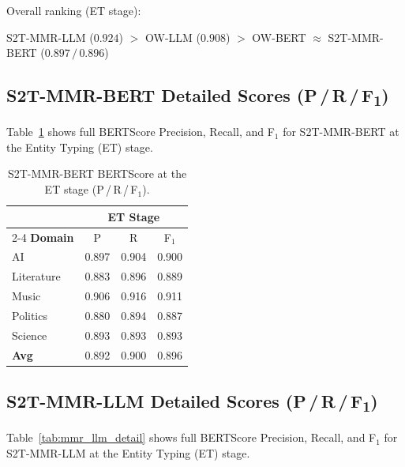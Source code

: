\documentclass[11pt,a4paper]{article}
\begin{document}
\noindent
Overall ranking (ET stage):
\begin{center}
S2T-MMR-LLM ($\mathbf{0.924}$)
$>$ OW-LLM ($0.908$)
$>$ OW-BERT $\approx$ S2T-MMR-BERT ($0.897\,/\,0.896$)
\end{center}

\subsection{S2T-MMR-BERT Detailed Scores (P\,/\,R\,/\,F\textsubscript{1})}

Table~\ref{tab:mmr_detail} shows full BERTScore Precision, Recall, and
F$_1$ for S2T-MMR-BERT at the Entity Typing (ET) stage.

\begin{table}[h]
\centering
\caption{S2T-MMR-BERT BERTScore at the ET stage (P\,/\,R\,/\,F$_1$).}
\label{tab:mmr_detail}
\setlength{\tabcolsep}{6pt}
\small
\begin{tabular}{l ccc}
\toprule
& \multicolumn{3}{c}{\cellcolor{s2tmmrcol}\textbf{ET Stage}} \\
\cmidrule(lr){2-4}
\textbf{Domain} & P & R & F$_1$ \\
\midrule
AI         & 0.897 & 0.904 & 0.900 \\
Literature & 0.883 & 0.896 & 0.889 \\
Music      & 0.906 & 0.916 & 0.911 \\
Politics   & 0.880 & 0.894 & 0.887 \\
Science    & 0.893 & 0.893 & 0.893 \\
\midrule
\textbf{Avg} & 0.892 & 0.900 & 0.896 \\
\bottomrule
\end{tabular}
\end{table}

\subsection{S2T-MMR-LLM Detailed Scores (P\,/\,R\,/\,F\textsubscript{1})}

Table~\ref{tab:mmr_llm_detail} shows full BERTScore Precision, Recall, and
F$_1$ for S2T-MMR-LLM at the Entity Typing (ET) stage.
\end{document}
